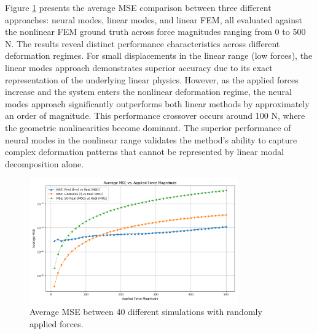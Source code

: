 Figure \ref{fig:static_mse_comparison} presents the average MSE comparison between three different approaches: neural modes, linear modes, and linear FEM, all evaluated against the nonlinear FEM ground truth across force magnitudes ranging from 0 to 500 N. The results reveal distinct performance characteristics across different deformation regimes. For small displacements in the linear range (low forces), the linear modes approach demonstrates superior accuracy due to its exact representation of the underlying linear physics. However, as the applied forces increase and the system enters the nonlinear deformation regime, the neural modes approach significantly outperforms both linear methods by approximately an order of magnitude. This performance crossover occurs around 100 N, where the geometric nonlinearities become dominant. The superior performance of neural modes in the nonlinear range validates the method's ability to capture complex deformation patterns that cannot be represented by linear modal decomposition alone.

\begin{figure}[H]
    \centering
    \includegraphics[width=0.8\textwidth]{Images/beam_static_mse.png}
    \caption{Average MSE between 40 different simulations with randomly applied forces.}
    \label{fig:static_mse_comparison}
\end{figure}

